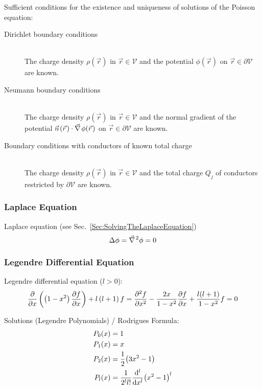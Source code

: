 			\noindent
			Sufficient conditions for the existence and uniqueness of solutions of the Poisson equation:
			\begin{description}
				\item[Dirichlet boundary conditions]\hfill \\
					The charge density $\rho(\vec{r})$ in $\vec{r}\in\mathcal{V}$ and the potential $\phi(\vec{r})$ on $\vec{r}\in\partial\mathcal{V}$ are known.
				\item[Neumann boundary conditions]\hfill \\
					The charge density  $\rho(\vec{r})$ in $\vec{r}\in\mathcal{V}$ and the normal gradient of the potential  $\vec{n}(\vec{r})\cdot\Nabla\phi(\vec{r})$ on $\vec{r}\in\partial\mathcal{V}$ are known.
				\item[Boundary conditions with conductors of known total charge]\hfill \\
					The charge density $\rho(\vec{r})$ in $\vec{r}\in\mathcal{V}$ and the total charge $Q_j$ of conductors restricted by $\partial\mathcal{V}$ are known.
			\end{description}

		\subsubsection{Laplace Equation}
			\noindent
			Laplace equation (see Sec.~\ref{Sec:SolvingTheLaplaceEquation})
			\begin{equation}
				\Delta\phi=\Nabla^2\phi = 0
			\end{equation}

		\subsubsection{Legendre Differential Equation}
			\noindent
			Legendre differential equation ($l>0$):
			\begin{equation}
				\pdv{x}\left(\left(1-x^2\right)\pdv{f}{x}\right)+l\left(l+1\right)f
				= \frac{\partial^2 f}{\partial x^2} - \frac{2x}{1-x^2}\pdv{f}{x} + \frac{l(l+1)}{1-x^2}f = 0
			\end{equation}

			\noindent
			Solutions (Legendre Polynomials) / Rodrigues Formula:
			\begin{equation} \label{Eq:LegendrePolynomials}
				\begin{aligned}
					P_0(x) &= 1 \\
					P_1(x) &= x \\
					P_2(x) &= \frac{1}{2}\qty(3x^2-1) \\
					P_l(x) &= \frac{1}{2^l l!}\dv[l]{x}\qty(x^2-1)^l \\
				\end{aligned}
			\end{equation}

